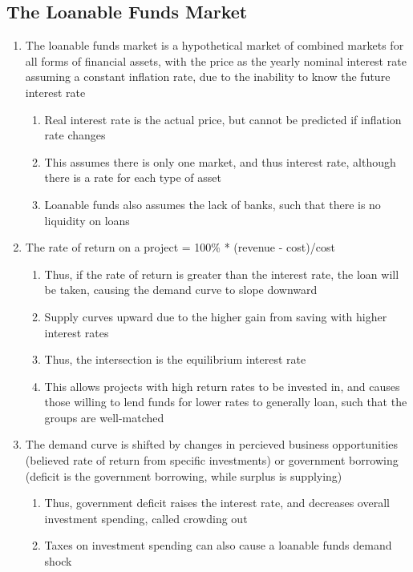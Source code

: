 \documentclass[11 pt, twoside]{article}
\begin{document}
\subsection{The Loanable Funds Market}
\begin{enumerate}
\item The loanable funds market is a hypothetical market of combined markets for all forms of financial assets, with the price as the yearly nominal interest rate assuming a constant inflation rate, due to the inability to know the future interest rate
\begin{enumerate}
\item Real interest rate is the actual price, but cannot be predicted if inflation rate changes
\item This assumes there is only one market, and thus interest rate, although there is a rate for each type of asset
\item Loanable funds also assumes the lack of banks, such that there is no liquidity on loans
\end{enumerate}
\item The rate of return on a project = 100\% * (revenue - cost)/cost
\begin{enumerate}
\item Thus, if the rate of return is greater than the interest rate, the loan will be taken, causing the demand curve to slope downward
\item Supply curves upward due to the higher gain from saving with higher interest rates
\item Thus, the intersection is the equilibrium interest rate
\item This allows projects with high return rates to be invested in, and causes those willing to lend funds for lower rates to generally loan, such that the groups are well-matched
\end{enumerate}
\item The demand curve is shifted by changes in percieved business opportunities (believed rate of return from specific investments) or government borrowing (deficit is the government borrowing, while surplus is supplying)
\begin{enumerate}
\item Thus, government deficit raises the interest rate, and decreases overall investment spending, called crowding out
\item Taxes on investment spending can also cause a loanable funds demand shock
\end{enumerate}

\end{enumerate}
\end{document}
